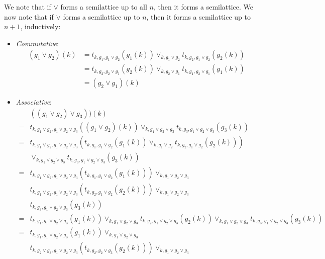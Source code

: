 \documentclass{article}
\begin{document}
        We note that if $\vee$ forms a semilattice up to all $n$, then it forms a semilattice. We now note that if $\vee$ forms a semilattice up to $n$, then it forms a semilattice up to $n+1$, inductively:

        \begin{itemize}
          \item \emph{Commutative}:
            \begin{align*}
              (g_1 \vee g_2)(k) &= t_{k, g_1, g_1 \vee g_2}(g_1(k)) \vee_{k, g_1 \vee g_2} t_{k, g_2, g_1 \vee g_2}(g_2(k)) \\
              &= t_{k, g_2, g_2 \vee g_1}(g_2(k)) \vee_{k, g_2 \vee g_1} t_{k, g_1, g_2 \vee g_1}(g_1(k)) \\
              &= (g_2 \vee g_1)(k)
            \end{align*}
          \item \emph{Associative}:
            \begin{align*}
              &((g_1 \vee g_2) \vee g_3))(k) \\
              =& t_{k, g_1 \vee g_2, g_1 \vee g_2 \vee g_3}((g_1 \vee g_2)(k)) \vee_{k, g_1 \vee g_2 \vee g_3} t_{k, g_3, g_1 \vee g_2 \vee g_3}(g_3(k)) \\
              =& t_{k, g_1 \vee g_2, g_1 \vee g_2 \vee g_3}\left(t_{k, g_1, g_1 \vee g_2}(g_1(k)) \vee_{k, g_1 \vee g_2} t_{k, g_2, g_1 \vee g_2}(g_2(k))\right) \\
               & \vee_{k, g_1 \vee g_2 \vee g_3} t_{k, g_3, g_1 \vee g_2 \vee g_3}(g_3(k)) \\
              =& t_{k, g_1 \vee g_2, g_1 \vee g_2 \vee g_3}(t_{k, g_1, g_1 \vee g_2}(g_1(k))) \vee_{k, g_1 \vee g_2 \vee g_3} \\
               & t_{k, g_1 \vee g_2, g_1 \vee g_2 \vee g_3}(t_{k, g_2, g_1 \vee g_2}(g_2(k))) \vee_{k, g_1 \vee g_2 \vee g_3} \\
               & t_{k, g_3, g_1 \vee g_2 \vee g_3}(g_3(k)) \\
              =& t_{k, g_1, g_1 \vee g_2 \vee g_3}(g_1(k)) \vee_{k, g_1 \vee g_2 \vee g_3}
                 t_{k, g_2, g_1 \vee g_2 \vee g_3}(g_2(k)) \vee_{k, g_1 \vee g_2 \vee g_3}
                 t_{k, g_3, g_1 \vee g_2 \vee g_3}(g_3(k)) \\
              =& t_{k, g_1, g_1 \vee g_2 \vee g_3}(g_1(k)) \vee_{k, g_1 \vee g_2 \vee g_3} \\
               & t_{k, g_2 \vee g_3, g_1 \vee g_2 \vee g_3}(t_{k, g_2, g_2 \vee g_3}(g_2(k))) \vee_{k, g_1 \vee g_2 \vee g_3} \\

\end{align*}
\end{itemize}
\end{document}
